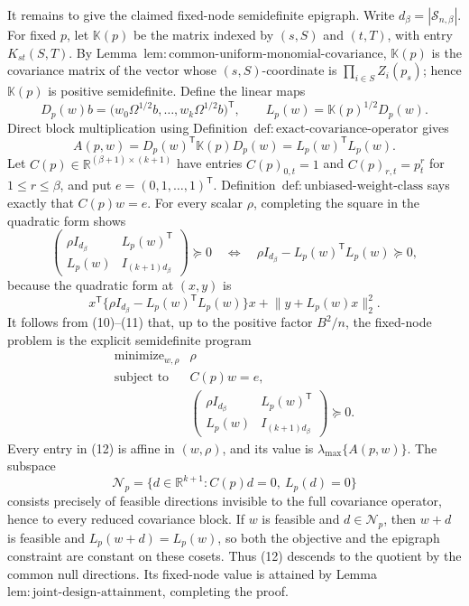 It remains to give the claimed fixed-node semidefinite epigraph.  Write \(d_\beta=|\mathcal S_{n,\beta}|\).  For fixed \(p\), let \(\mathbb K(p)\) be the matrix indexed by \((s,S)\) and \((t,T)\), with entry \(K_{st}(S,T)\).  By Lemma~\(\mathrm{lem{:}common\text{-}uniform\text{-}monomial\text{-}covariance}\), \(\mathbb K(p)\) is the covariance matrix of the vector whose \((s,S)\)-coordinate is \(\prod_{i\in S}Z_i(p_s)\); hence \(\mathbb K(p)\) is positive semidefinite.  Define the linear maps
\[
D_p(w)b=
\bigl(w_0\Omega^{1/2}b,\ldots,w_k\Omega^{1/2}b\bigr)^{\mathsf T},
\qquad
L_p(w)=\mathbb K(p)^{1/2}D_p(w).
\]
Direct block multiplication using Definition~\(\mathrm{def{:}exact\text{-}covariance\text{-}operator}\) gives
\[
A(p,w)=D_p(w)^{\mathsf T}\mathbb K(p)D_p(w)
=L_p(w)^{\mathsf T}L_p(w).
\tag{10}
\]
Let \(C(p)\in\mathbb R^{(\beta+1)\times(k+1)}\) have entries \(C(p)_{0,t}=1\) and \(C(p)_{r,t}=p_t^r\) for \(1\le r\le\beta\), and put \(e=(0,1,\ldots,1)^{\mathsf T}\).  Definition~\(\mathrm{def{:}unbiased\text{-}weight\text{-}class}\) says exactly that \(C(p)w=e\).  For every scalar \(\rho\), completing the square in the quadratic form shows
\[
\begin{pmatrix}
\rho I_{d_\beta}&L_p(w)^{\mathsf T}\\
L_p(w)&I_{(k+1)d_\beta}
\end{pmatrix}\succeq0
\quad\Longleftrightarrow\quad
\rho I_{d_\beta}-L_p(w)^{\mathsf T}L_p(w)\succeq0,
\tag{11}
\]
because the quadratic form at \((x,y)\) is
\[
x^{\mathsf T}\{\rho I_{d_\beta}-L_p(w)^{\mathsf T}L_p(w)\}x
+\lVert y+L_p(w)x\rVert_2^2.
\]
It follows from (10)--(11) that, up to the positive factor \(B^2/n\), the fixed-node problem is the explicit semidefinite program
\[
\begin{array}{ll}
\operatorname{minimize}_{w,\rho}&\rho\\
\operatorname{subject\ to}&C(p)w=e,\\
&\begin{pmatrix}
\rho I_{d_\beta}&L_p(w)^{\mathsf T}\\
L_p(w)&I_{(k+1)d_\beta}
\end{pmatrix}\succeq0.
\end{array}
\tag{12}
\]
Every entry in (12) is affine in \((w,\rho)\), and its value is \(\lambda_{\max}\{A(p,w)\}\).  The subspace
\[
\mathcal N_p=\{d\in\mathbb R^{k+1}:C(p)d=0,\ L_p(d)=0\}
\]
consists precisely of feasible directions invisible to the full covariance operator, hence to every reduced covariance block.  If \(w\) is feasible and \(d\in\mathcal N_p\), then \(w+d\) is feasible and \(L_p(w+d)=L_p(w)\), so both the objective and the epigraph constraint are constant on these cosets.  Thus (12) descends to the quotient by the common null directions.  Its fixed-node value is attained by Lemma~\(\mathrm{lem{:}joint\text{-}design\text{-}attainment}\), completing the proof.